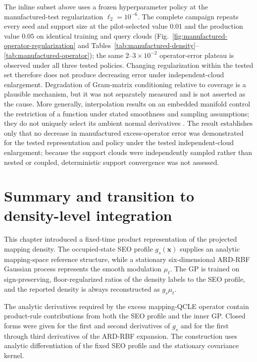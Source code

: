 \documentclass[
  11pt,
  letterpaper,
  onehalfspacing,
  normalmargins,
  equalmargins,
  oneside
]{ut-thesis}
\begin{document}
The inline subset above uses a frozen hyperparameter policy at the
manufactured-test regularization \(\ell_2=10^{-6}\). The complete campaign
repeats every seed and support size at the pilot-selected value \(0.01\) and
the production value \(0.05\) on identical training and query clouds
(Fig.~\ref{fig:manufactured-operator-regularization} and
Tables~\ref{tab:manufactured-density}--\ref{tab:manufactured-operator}); the
same \(2\)--\(3\times10^{-2}\) operator-error plateau is observed under all
three tested policies. Changing regularization within the tested set therefore
does not produce decreasing error under independent-cloud enlargement.
Degradation of Gram-matrix conditioning relative to coverage is a plausible
mechanism, but it was not separately measured and is not asserted as the
cause. More generally, interpolation results on an embedded manifold control
the restriction of a function under stated smoothness and sampling
assumptions; they do not uniquely select its ambient normal derivatives
\cite{Whitney1934Extensions,FuselierWright2012}. The result establishes only
that no decrease in manufactured excess-operator error was demonstrated for
the tested representation and policy under the tested independent-cloud
enlargement; because the support clouds were independently sampled rather
than nested or coupled, deterministic support convergence was not assessed.


\section{Summary and transition to density-level integration}
\label{sec:summary-transition-density-integration}

This chapter introduced a fixed-time product representation of the projected
mapping density. The occupied-state SEO profile
\(g_s(\mathbf x)\) supplies an analytic mapping-space reference structure,
while a stationary six-dimensional ARD-RBF Gaussian process represents the
smooth modulation \(\mu_t\). The GP is trained on sign-preserving,
floor-regularized ratios of the density labels to the SEO profile, and the
reported density is always reconstructed as \(g_s\mu_t\).

The analytic derivatives required by the excess mapping-QCLE operator contain
product-rule contributions from both the SEO profile and the inner GP. Closed
forms were given for the first and second derivatives of \(g_s\) and for the
first through third derivatives of the ARD-RBF expansion. The construction
uses analytic differentiation of the fixed SEO profile and the stationary
covariance kernel.
\end{document}
